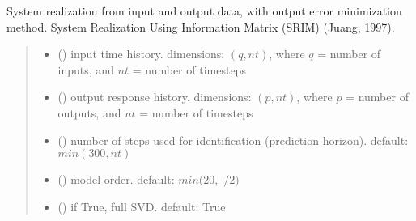 \documentclass[letterpaper,10pt,english]{sphinxmanual}
\begin{document}
\begin{fulllineitems}
\label{\detokenize{library/mdof.realize:mdof.realize.srim}}
\pysigstartsignatures
{}
\pysigstopsignatures
\sphinxAtStartPar
System realization from input and output data, with output error minimization method.
System Realization Using Information Matrix (SRIM) (Juang, 1997).
\begin{quote}\begin{description}
\begin{itemize}
\item {} 
\sphinxAtStartPar
{} () \textendash{} input time history. dimensions: \((q,nt)\), where
\(q\) = number of inputs, and \(nt\) = number of timesteps

\item {} 
\sphinxAtStartPar
{} () \textendash{} output response history.
dimensions: \((p,nt)\), where \(p\) = number of outputs, and
\(nt\) = number of timesteps

\item {} 
\sphinxAtStartPar
{} (\sphinxstyleliteralemphasis{\sphinxupquote{, }}) \textendash{} number of steps used for identification (prediction horizon).
default: \(min(300, nt)\)

\item {} 
\sphinxAtStartPar
{} (\sphinxstyleliteralemphasis{\sphinxupquote{, }}) \textendash{} model order. default: \(min(20,\) \(/2)\)

\item {} 
\sphinxAtStartPar
{} (\sphinxstyleliteralemphasis{\sphinxupquote{, }}) \textendash{} if True, full SVD. default: True


\end{itemize}
\end{description}
\end{quote}
\end{fulllineitems}
\end{document}
